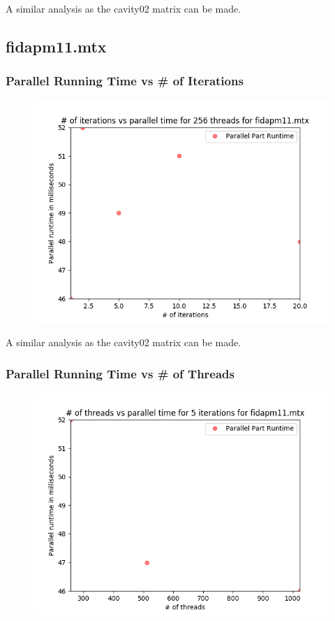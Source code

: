 \documentclass{article}
\begin{document}
\null \qquad A similar analysis as the cavity02 matrix can be made.


\subsection{fidapm11.mtx}
\subsubsection{Parallel Running Time vs # of Iterations}

\begin{figure}[H]
\centering
\includegraphics[width=\linewidth]{assets/fidapm11_iter_parallel.png}
\label{fig:test1}
\vspace{-2pt}
\end{figure}

\null \qquad A similar analysis as the cavity02 matrix can be made.

\subsubsection{Parallel Running Time vs # of Threads}

\begin{figure}[H]
\centering
\includegraphics[width=\linewidth]{assets/fidapm11_thr_parallel.png}
\label{fig:test1}
\vspace{-2pt}
\end{figure}
\end{document}
